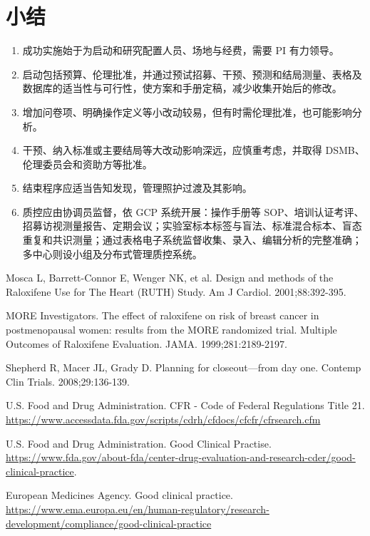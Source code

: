 \section{小结}
\begin{enumerate}
\item 成功实施始于为启动和研究配置人员、场地与经费，需要 PI 有力领导。
\item 启动包括预算、伦理批准，并通过预试招募、干预、预测和结局测量、表格及数据库的适当性与可行性，使方案和手册定稿，减少收集开始后的修改。
\item 增加问卷项、明确操作定义等小改动较易，但有时需伦理批准，也可能影响分析。
\item 干预、纳入标准或主要结局等大改动影响深远，应慎重考虑，并取得 DSMB、伦理委员会和资助方等批准。
\item 结束程序应适当告知发现，管理照护过渡及其影响。
\item 质控应由协调员监督，依 GCP 系统开展：操作手册等 SOP、培训认证考评、招募访视测量报告、定期会议；实验室标本标签与盲法、标准混合标本、盲态重复和共识测量；通过表格电子系统监督收集、录入、编辑分析的完整准确；多中心则设小组及分布式管理质控系统。
\end{enumerate}

\begin{references}
\item Mosca L, Barrett-Connor E, Wenger NK, et al. Design and methods of the Raloxifene Use for The Heart (RUTH) Study. Am J Cardiol. 2001;88:392-395.
\item MORE Investigators. The effect of raloxifene on risk of breast cancer in postmenopausal women: results from the MORE randomized trial. Multiple Outcomes of Raloxifene Evaluation. JAMA. 1999;281:2189-2197.
\item Shepherd R, Macer JL, Grady D. Planning for closeout—from day one. Contemp Clin Trials. 2008;29:136-139.
\item U.S. Food and Drug Administration. CFR - Code of Federal Regulations Title 21. \url{https://www.accessdata.fda.gov/scripts/cdrh/cfdocs/cfcfr/cfrsearch.cfm}
\item U.S. Food and Drug Administration. Good Clinical Practise. \url{https://www.fda.gov/about-fda/center-drug-evaluation-and-research-cder/good-clinical-practice}.
\item European Medicines Agency. Good clinical practice. \url{https://www.ema.europa.eu/en/human-regulatory/research-development/compliance/good-clinical-practice}
\end{references}

